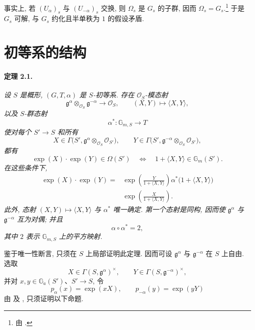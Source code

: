 事实上, 若 \((U_\alpha)_s\) 与 \((U_{-\alpha})_s\) 交换, 则 \(\Omega_s\) 是 \(G_s\) 的子群, 因而 \(\Omega_s=G_s\).\footnote{由 .} 于是 \(G_s\) 可解, 与 \(G_s\) 约化且半单秩为 \(1\) 的假设矛盾.

\section{初等系的结构}
\paragraph{\textbf{定理 2.1.}}
\emph{设 \(S\) 是概形, \((G,T,\alpha)\) 是 \(S\)-初等系. 存在 \(\mathscr O_S\)-模态射}
\[
  \mathfrak g^\alpha\otimes_{\mathscr O_S}\mathfrak g^{-\alpha}
    \longrightarrow\mathscr O_S,
  \qquad
  (X,Y)\longmapsto\langle X,Y\rangle,
\]
\emph{以及 \(S\)-群态射}
\[
  \alpha^\ast\colon\mathbb G_{m,S}\longrightarrow T
\]
\emph{使对每个 \(S'\to S\) 和所有}
\[
  X\in\Gamma\bigl(S',
    \mathfrak g^\alpha\otimes_{\mathscr O_S}\mathscr O_{S'}\bigr),
  \qquad
  Y\in\Gamma\bigl(S',
    \mathfrak g^{-\alpha}\otimes_{\mathscr O_S}\mathscr O_{S'}\bigr),
\]
\emph{都有}
\[
  \exp(X)\mathbin{\cdot}\exp(Y)\in\Omega(S')
  \quad\Longleftrightarrow\quad
  1+\langle X,Y\rangle\in\mathbb G_m(S').
\]
\emph{在这些条件下,}
\begin{equation}\tag{F}
\begin{aligned}
  \exp(X)\mathbin{\cdot}\exp(Y)
   ={}&\exp\left(\frac{Y}{1+\langle X,Y\rangle}\right)
       \alpha^\ast\bigl(1+\langle X,Y\rangle\bigr)\\
     &{}\exp\left(\frac{X}{1+\langle X,Y\rangle}\right).
\end{aligned}
\end{equation}
\emph{此外, 态射 \((X,Y)\mapsto\langle X,Y\rangle\) 与 \(\alpha^\ast\) 唯一确定. 第一个态射是同构, 因而使 \(\mathfrak g^\alpha\) 与 \(\mathfrak g^{-\alpha}\) 互为对偶; 并且}
\[
  \alpha\circ\alpha^\ast=2,
\]
\emph{其中 \(2\) 表示 \(\mathbb G_{m,S}\) 上的平方映射.}

鉴于唯一性断言, 只须在 \(S\) 上局部证明此定理. 因而可设 \(\mathfrak g^\alpha\) 与 \(\mathfrak g^{-\alpha}\) 在 \(S\) 上自由. 选取
\[
  X\in\Gamma(S,\mathfrak g^\alpha)^\times,\qquad
  Y\in\Gamma(S,\mathfrak g^{-\alpha})^\times,
\]
并对 \(x,y\in\mathbb G_a(S')\)、\(S'\to S\), 令
\[
  p_\alpha(x)=\exp(xX),\qquad
  p_{-\alpha}(y)=\exp(yY)
\]
由  及 , 只须证明以下命题.

